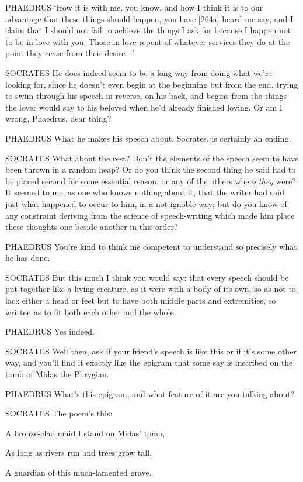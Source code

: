 PHAEDRUS ‘How it is with me, you know, and how I think it is to our
advantage that these things should happen, you have {[}264a{]} heard me
say; and I claim that I should not fail to achieve the things I ask for
because I happen not to be in love with you. Those in love repent of
whatever services they do at the point they cease from their desire --'

SOCRATES He does indeed seem to be a long way from doing  what
we're looking for, since he doesn't even begin at the beginning but from
the end, trying to swim through his speech in reverse, on his back, and
begins from the things the lover would say to his beloved when he'd
already finished loving. Or am I wrong, Phaedrus, dear
thing?

 PHAEDRUS What he makes his speech about, Socrates, is certainly
an ending.

SOCRATES What about the rest? Don't the elements of the speech seem to
have been thrown in a random heap? Or do you  think the second
thing he said had to be placed second for some essential reason, or any
of the others where {\em they} were? It seemed to me, as one who knows
nothing about it, that the writer had said just what happened to occur
to him, in a not ignoble way; but do you know of any constraint deriving
from the science of speech-writing which made him place these thoughts
one beside another in this order?

PHAEDRUS You're kind to think me competent to understand  so
precisely what he has done.

SOCRATES But this much I think you would say: that every speech should
be put together like a living creature, as it were with a body of its
own, so as not to lack either a head or feet  but to have both
middle parts and extremities, so written as to fit both each other and
the whole.

PHAEDRUS Yes indeed.

SOCRATES Well then, ask if your friend's speech is like this or if it's
some other way, and you'll find it exactly like the epigram that some
say is inscribed on the tomb of Midas the
Phrygian.

PHAEDRUS What's this epigram, and what feature of it are you 
talking about?

SOCRATES The poem's this:

A bronze-clad maid I stand on Midas' tomb,

As long as rivers run and trees grow tall,

A guardian of this much-lamented grave, 

